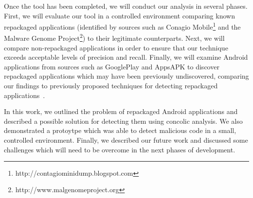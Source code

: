 \documentclass{sig-alternate}
\begin{document}
%


Once the tool has been completed, we will conduct our analysis in several phases. First, we will evaluate our tool in a controlled environment comparing known repackaged applications (identified by sources such as Conagio Mobile\footnote{http://contagiominidump.blogspot.com} and the Malware Genome Project\footnote{http://www.malgenomeproject.org}) to their legitimate counterparts. Next, we will compare non-repackaged applications in order to ensure that our technique exceeds acceptable levels of precision and recall. Finally, we will examine Android applications from sources such as GooglePlay and AppsAPK to discover repackaged applications which may have been previously undiscovered, comparing our findings to previously proposed techniques for detecting repackaged applications~\cite{Chen:2014:AAS:2568225.2568286, Zhou:2012:DRS:2133601.2133640,Zhang:2014:VTO:2627393.2627395}.

In this work, we outlined the problem of repackaged Android applications and described a possible solution for detecting them using concolic analysis. We also demonstrated a protoytpe which was able to detect malicious code in a small, controlled environment. Finally, we described our future work and discussed some challenges which will need to be overcome in the next phases of development.






\end{document}
